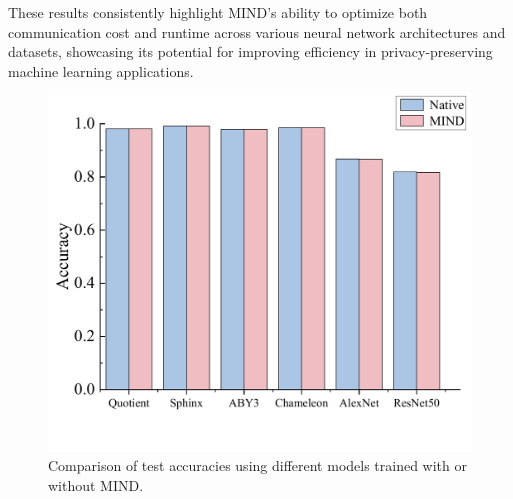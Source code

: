\documentclass[conference]{IEEEtran}
\begin{document}
These results consistently highlight MIND's ability to optimize both communication cost and runtime across various neural network architectures and datasets, showcasing its potential for improving efficiency in privacy-preserving machine learning applications.

\begin{figure}[ht]
\centering
\includegraphics[width=.8\linewidth]{ACC.pdf}
\caption{Comparison of test accuracies using different models trained with or without MIND.} \label{fig:ACC}
\end{figure}
\end{document}
